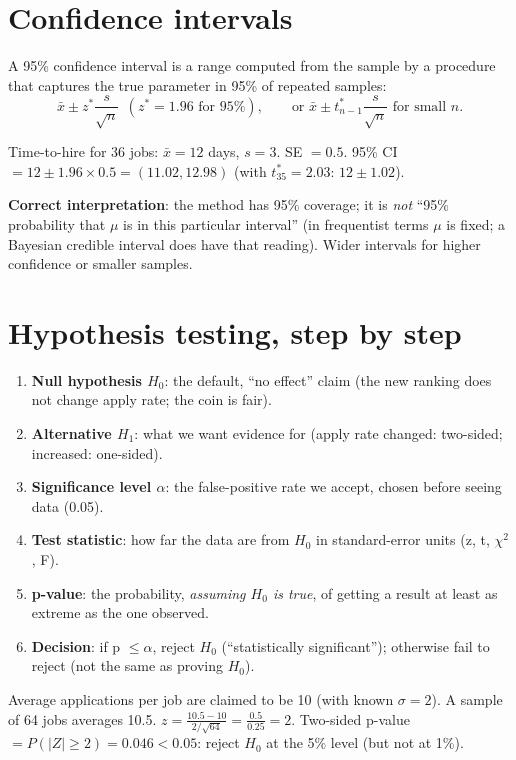 \section{Confidence intervals}
A 95\% confidence interval is a range computed from the sample by a procedure that captures the true parameter in 95\% of repeated samples:
\[ \bar x\pm z^*\frac{s}{\sqrt n}\ \ (z^* = 1.96\text{ for }95\%),\qquad\text{or } \bar x\pm t^*_{n-1}\frac{s}{\sqrt n}\text{ for small }n. \]
\begin{example}
Time-to-hire for 36 jobs: $\bar x = 12$ days, $s = 3$. SE $= 0.5$. 95\% CI $= 12\pm1.96\times0.5 = (11.02, 12.98)$ (with $t^*_{35} = 2.03$: $12\pm1.02$).
\end{example}
\textbf{Correct interpretation}: the method has 95\% coverage; it is \emph{not} ``95\% probability that $\mu$ is in this particular interval'' (in frequentist terms $\mu$ is fixed;
a Bayesian credible interval does have that reading). Wider intervals for higher confidence or smaller samples.

\section{Hypothesis testing, step by step}
\begin{enumerate}
\item \textbf{Null hypothesis $H_0$}: the default, ``no effect'' claim (the new ranking does not change apply rate; the coin is fair).
\item \textbf{Alternative $H_1$}: what we want evidence for (apply rate changed: two-sided; increased: one-sided).
\item \textbf{Significance level $\alpha$}: the false-positive rate we accept, chosen before seeing data (0.05).
\item \textbf{Test statistic}: how far the data are from $H_0$ in standard-error units (z, t, $\chi^2$, F).
\item \textbf{p-value}: the probability, \emph{assuming $H_0$ is true}, of getting a result at least as extreme as the one observed.
\item \textbf{Decision}: if p $\le\alpha$, reject $H_0$ (``statistically significant''); otherwise fail to reject (not the same as proving $H_0$).
\end{enumerate}
\begin{example}[: a z-test]
Average applications per job are claimed to be 10 (with known $\sigma = 2$). A sample of 64 jobs averages 10.5. $z = \frac{10.5 - 10}{2/\sqrt{64}} = \frac{0.5}{0.25} = 2$.
Two-sided p-value $= P(|Z|\ge2) = 0.046 < 0.05$: reject $H_0$ at the 5\% level (but not at 1\%).
\end{example}

